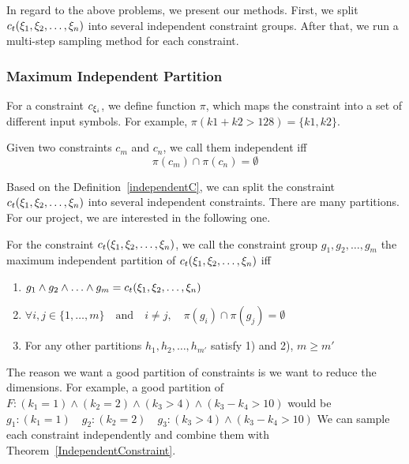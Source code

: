 In regard to the above problems, we present our methods. First, we split
$c_t({\xi}_{1},{\xi}_{2},\ldots,{\xi}_{n})$ into several independent constraint
groups. After that, we run a multi-step sampling method for each constraint.

\subsubsection{Maximum Independent Partition}

For a constraint $c_{{\xi}_{i}}$, we define function $\pi$, which maps the
constraint into a set of different input symbols. For example, $\pi(k1 + k2 >
128) = \{k1, k2\}$.

\begin{mydef}[]
      \label{independentC}
      Given two constraints $c_m$ and $c_n$, we call them independent iff
      $$\pi(c_m) \cap \pi(c_n) = \emptyset$$
\end{mydef}

Based on the Definition~\ref{independentC}, we can split the constraint
$c_t({\xi}_{1},{\xi}_{2},\ldots,{\xi}_{n})$ into several independent constraints.
There are many partitions. For our project, we are interested in the following
one.

\begin{mydef}\label{Goodpartition}
      For the constraint $c_t({\xi}_{1},{\xi}_{2},\ldots,{\xi}_{n})$,
      we call the constraint group
      $g_{1}, g_{2}, \ldots, g_{m}$
      the maximum independent partition of $c_t({\xi}_{1},{\xi}_{2},\ldots,{\xi}_{n})$ iff
      \begin{enumerate}
            \item $g_{1} \land g_{2} \land \ldots \land g_{m} = c_t({\xi}_{1},{\xi}_{2},\ldots,{\xi}_{n})$
            \item $\forall i, j \in \{1, \ldots, m\} \quad \textrm{and} \quad
                        i \neq j,\quad\pi(g_{i}) \cap \pi(g_{j}) = \emptyset $
            \item For any other partitions  $h_{1}, h_{2}, \ldots, h_{m'}$ satisfy 1) and
                  2), $m \geq m'$
      \end{enumerate}

\end{mydef}

The reason we want a good partition of constraints is we want to reduce
the dimensions. For example,
a good partition of $F: ({k_1} = 1)\land({k_2} = 2)\land({k_3} > 4)\land({k_3} - {k_4} > 10)$ would be
$g_{1}: ({k_1} = 1)\quad g_{2}: ({k_2} = 2)\quad g_{3}: ({k_3} > 4) \land
({k_3} - {k_4} > 10)$  
We can sample each constraint independently and combine them
with Theorem~\ref{IndependentConstraint}.

